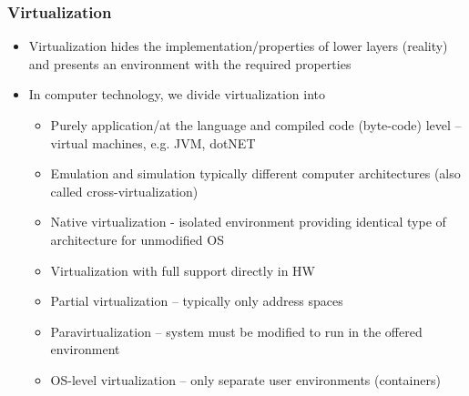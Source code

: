 \documentclass{beamer}
\begin{document}
\begin{frame}
\frametitle{Virtualization}

\begin{itemize}
 \item Virtualization hides the implementation/properties of lower layers (reality) and presents an environment with the required properties
 \item In computer technology, we divide virtualization into
 \begin{itemize}
  \item Purely application/at the language and compiled code (byte-code) level – virtual machines, e.g. JVM, dotNET
  \item Emulation and simulation typically different computer architectures (also called cross-virtualization)
  \item Native virtualization - isolated environment providing identical type of architecture for unmodified OS
  \item Virtualization with full support directly in HW
  \item Partial virtualization -- typically only address spaces
  \item Paravirtualization -- system must be modified to run in the offered environment
  \item OS-level virtualization -- only separate user environments (containers)
 \end{itemize}
\end{itemize}
\end{frame}
\end{document}
